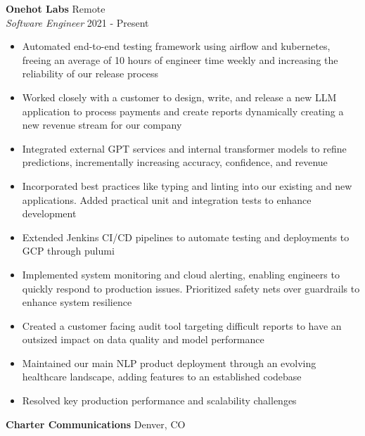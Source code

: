\documentclass[a4paper]{article}
\begin{document}
\textbf{Onehot Labs} \hfill Remote\\
\textit{Software Engineer} \hfill 2021 - Present\\
\vspace{-1mm}
\begin{itemize} \itemsep 1pt
  \item Automated end-to-end testing framework using airflow and kubernetes, freeing an average of 10 hours of engineer time weekly and increasing the reliability of our release process
  \item Worked closely with a customer to design, write, and release a new LLM application to process payments and create reports dynamically creating a new revenue stream for our company
  \item Integrated external GPT services and internal transformer models to refine predictions, incrementally increasing accuracy, confidence, and revenue
  \item Incorporated best practices like typing and linting into our existing and new applications. Added practical unit and integration tests to enhance development
  \item Extended Jenkins CI/CD pipelines to automate testing and deployments to GCP through pulumi
  \item Implemented system monitoring and cloud alerting, enabling engineers to quickly respond to production issues. Prioritized safety nets over guardrails to enhance system resilience
  \item Created a customer facing audit tool targeting difficult reports to have an outsized impact on data quality and model performance
  \item Maintained our main NLP product deployment through an evolving healthcare landscape, adding features to an established codebase
  \item Resolved key production performance and scalability challenges

\end{itemize}

\textbf{Charter Communications} \hfill Denver, CO\\
\end{document}
